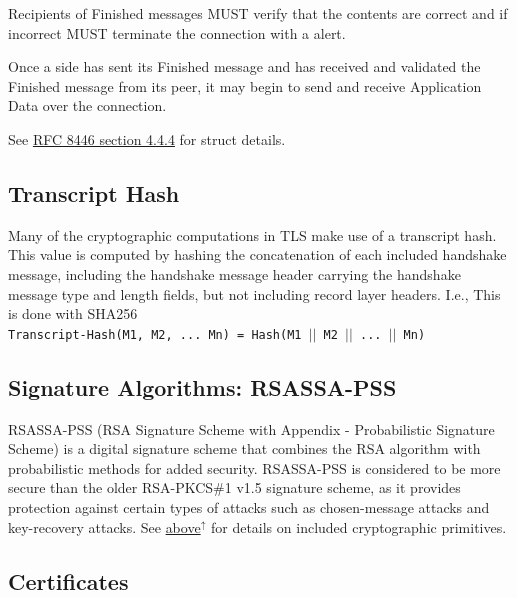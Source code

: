 \documentclass{article}
\newcommand{\code}[1]{\tcbox[
    on line,
    colback=codebackground, boxsep=2pt,
    colframe=white, boxrule=0pt,
    top=0pt, bottom=0pt, left=0pt, right=0pt
]{\texttt{#1}}}
\begin{document}
Recipients of Finished messages MUST verify that the contents are
correct and if incorrect MUST terminate the connection with a \code{decrypt\_error} alert.

Once a side has sent its Finished message and has received and validated the Finished message from its peer,
it may begin to send and receive Application Data over the connection.

See \href{https://datatracker.ietf.org/doc/html/rfc8446#section-4.4.4}{RFC 8446 section 4.4.4\tiny\faExternalLink} for struct details.

\subsection{Transcript Hash}
Many of the cryptographic computations in TLS make use of a
transcript hash.  This value is computed by hashing the concatenation
of each included handshake message, including the handshake message
header carrying the handshake message type and length fields, but not
including record layer headers.  I.e., This is done with SHA256\\

\texttt{Transcript-Hash(M1, M2, ... Mn) = Hash(M1 $||$ M2 $||$ ... $||$ Mn)}

\subsection{Signature Algorithms: RSASSA-PSS}
RSASSA-PSS (RSA Signature Scheme with Appendix - Probabilistic Signature Scheme) is a digital signature scheme that combines the RSA algorithm with probabilistic methods for added security.
RSASSA-PSS is considered to be more secure than the older RSA-PKCS\#1 v1.5 signature scheme,
as it provides protection against certain types of attacks such as chosen-message attacks and key-recovery attacks.
See \hyperref[sec:Crypto-RSASSA-PSS]{above$^\uparrow$} for details on included cryptographic primitives.

\subsection{Certificates}

\end{document}

